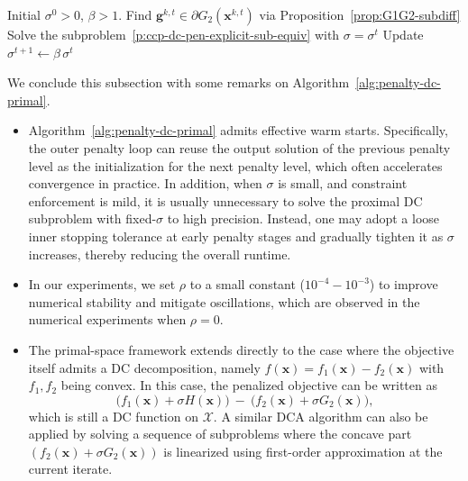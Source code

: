 \documentclass[11pt]{article}
\def\bs{\boldsymbol}
\def\X{\mathcal{X}}
\begin{document}
\begin{algorithm}[ht]
\caption{Penalty Based Proximal DC Algorithm in the Primal Space} \label{alg:penalty-dc-primal}
\begin{algorithmic}[1]
\Require Initial $\sigma^0>0$, $\beta>1$.
\State Find $\bs{g}^{k,t} \in \partial G_2(\bs{x}^{k,t})$ via Proposition~\ref{prop:G1G2-subdiff} 
\State Solve the subproblem~\eqref{p:ccp-dc-pen-explicit-sub-equiv} with $\sigma = \sigma^t$
\EndFor
\State Update $\sigma^{t+1}\gets \beta\,\sigma^t$
\EndFor
\end{algorithmic}
\end{algorithm}

We conclude this subsection with some remarks on Algorithm~\ref{alg:penalty-dc-primal}.
\begin{itemize}
\item[(i)] 
Algorithm~\ref{alg:penalty-dc-primal} admits effective warm starts. Specifically, the outer penalty loop can reuse the output solution of the previous penalty level as the initialization for the next penalty level, which often accelerates convergence in practice. In addition, when $\sigma$ is small, and constraint enforcement is mild, it is usually unnecessary to solve the proximal DC subproblem with fixed-$\sigma$ to high precision. Instead, one may adopt a loose inner stopping tolerance at early penalty stages and gradually tighten it as $\sigma$ increases, thereby reducing the overall runtime.

\item[(ii)] 
In our experiments, we set $\rho$ to a small constant ($10^{-4} -10^{-3}$) to improve numerical stability and mitigate oscillations, which are observed in the numerical experiments when $\rho=0$. 

\item[(iii)] The primal-space framework extends directly to the case where the objective itself admits a DC decomposition, namely $f(\bs{x})=f_1(\bs{x})-f_2(\bs{x})$ with $f_1,f_2$ being convex. In this case, the penalized objective can be written as
\[
\bigl(f_1(\bs{x})+\sigma H(\bs{x})\bigr)\ -\ \bigl(f_2(\bs{x})+\sigma G_2(\bs{x})\bigr),
\]
which is still a DC function on $\X$. A similar DCA algorithm can also be applied by solving a sequence of subproblems where the concave part $(f_2(\bs{x})+\sigma G_2(\bs{x}))$ is linearized using first-order approximation at the current iterate.
\end{itemize}
\end{document}
